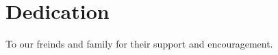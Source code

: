 \documentclass[a4paper,12pt,bibtotoc,notitlepage,oneside]{book}
\numberwithin{equation}{section}  %
\numberwithin{figure}{chapter}    %
\begin{document}
\chapter*{Dedication}
To our freinds and family for their support and encouragement.



\cleardoublepage
\tableofcontents





\clearpage

\listoffigures{}

\clearpage
\listoftables{}


\end{document}
